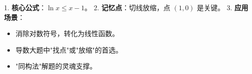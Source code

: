 \begin{summarybox}
1. \textbf{核心公式}：$\ln x \leqslant x - 1$。
2. \textbf{记忆点}：切线放缩，点 $(1, 0)$ 是关键。
3. \textbf{应用场景}：
    \begin{itemize}
        \item 消除对数符号，转化为线性函数。
        \item 导数大题中"找点"或"放缩"的首选。
        \item "同构法"解题的灵魂支撑。
    \end{itemize}
\end{summarybox}